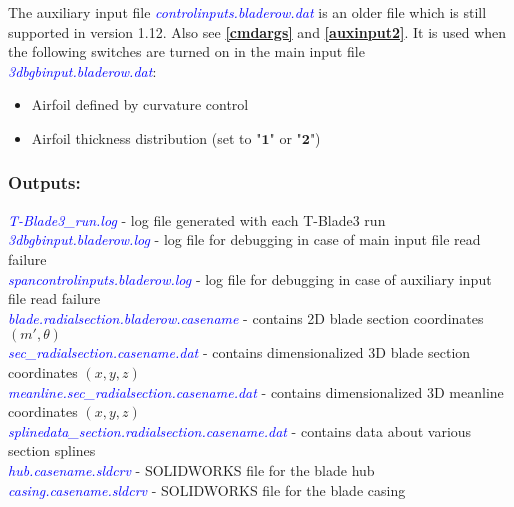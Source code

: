 \documentclass[8pt]{article}
\begin{document}
\noindent 
The auxiliary input file \textit{\textcolor{blue}{controlinputs.bladerow.dat}} is an older file which is still supported in version 1.12. Also see \textbf{\ref{cmdargs}} and \textbf{\ref{auxinput2}}. It is used when the following switches are turned on in the main input file \textit{\textcolor{blue}{3dbgbinput.bladerow.dat}}:
\begin{itemize}
    \item Airfoil defined by curvature control 
    \item Airfoil thickness distribution (set to "$\mathbf{1}$" or "$\mathbf{2}$")
\end{itemize}

\subsubsection{Outputs:}\label{outputs}
\noindent
\textit{\textcolor{blue}{T-Blade3\_run.log}} - log file generated with each T-Blade3 run\\
\textit{\textcolor{blue}{3dbgbinput.bladerow.log}} - log file for debugging in case of main input file read failure\\
\textit{\textcolor{blue}{spancontrolinputs.bladerow.log}} - log file for debugging in case of auxiliary input file read failure\\
\textit{\textcolor{blue}{blade.radialsection.bladerow.casename}} - contains 2D blade section coordinates $(m',\theta)$\\
\textit{\textcolor{blue}{sec\_radialsection.casename.dat}} - contains dimensionalized 3D blade section coordinates $(x,y,z)$\\
\textit{\textcolor{blue}{meanline.sec\_radialsection.casename.dat}} - contains dimensionalized 3D meanline coordinates $(x,y,z)$\\
\textit{\textcolor{blue}{splinedata\_section.radialsection.casename.dat}} - contains data about various section splines\\
\textit{\textcolor{blue}{hub.casename.sldcrv}} - SOLIDWORKS file for the blade hub\\
\textit{\textcolor{blue}{casing.casename.sldcrv}} - SOLIDWORKS file for the blade casing\\
\end{document}

